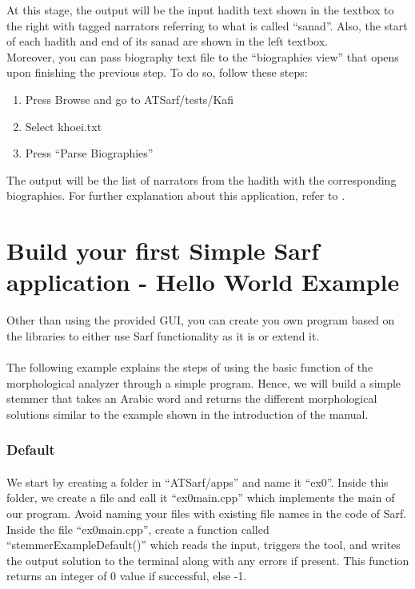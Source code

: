 \documentclass{article}
\begin{document}
At this stage, the output will be the input hadith text shown in the textbox to the right with tagged narrators referring to what is called ``sanad''. Also, the start of each hadith and end of its sanad are shown in the left textbox.\\

Moreover, you can pass biography text file to the ``biographies view'' that opens upon finishing the previous step. To do so, follow these steps:
\begin{enumerate}
\item Press Browse and go to ATSarf/tests/Kafi
\item Select khoei.txt
\item Press ``Parse Biographies''
\end{enumerate}

The output will be the list of narrators from the hadith with the corresponding biographies. For further explanation about this application, refer to \cite{zaraket2012arabic}.

\section{Build your first Simple Sarf application - Hello World Example}
\label{subsec:hwex}

Other than using the provided GUI, you can create you own program based on the libraries to either use Sarf functionality as it is or extend it.

\paragraph{}
The following example explains the steps of using the basic function of the morphological analyzer through a simple program. Hence, we will build a simple stemmer that takes an Arabic word and returns the different morphological solutions similar to the example shown in the introduction of the manual.

\subsubsection{Default}
\label{subsubsec:default}

\paragraph{}
We start by creating a folder in ``ATSarf/apps'' and name it ``ex0''. Inside this folder, we create a file and call it ``ex0main.cpp'' which implements the main of our program. Avoid naming your files with existing file names in the code of Sarf. Inside the file ``ex0main.cpp'', create a function called ``stemmerExampleDefault()'' which reads the input, triggers the tool, and writes the output solution to the terminal along with any errors if present. This function returns an integer of 0 value if successful, else -1.
\end{document}
